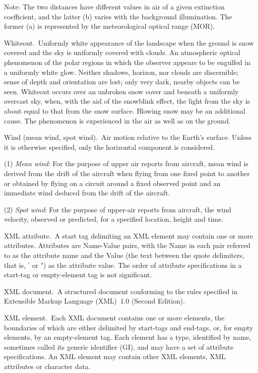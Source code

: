 Note: The two distances have different values in air of a given extinction coefficient, and the latter (b) varies with the background illumination. The former (a) is represented by the meteorological optical range (MOR).

Whiteout. Uniformly white appearance of the landscape when the ground is snow covered and the sky is uniformly covered with clouds. An atmospheric optical phenomenon of the polar regions in which the observer appears to be engulfed in a uniformly white glow. Neither shadows, horizon, nor clouds are discernible; sense of depth and orientation are lost; only very dark, nearby objects can be seen. Whiteout occurs over an unbroken snow cover and beneath a uniformly overcast sky, when, with the aid of the snowblink effect, the light from the sky is about equal to that from the snow surface. Blowing snow may be an additional cause. The phenomenon is experienced in the air as well as on the ground.

Wind (mean wind, spot wind). Air motion relative to the Earth's surface. Unless it is otherwise specified, only the horizontal component is considered.

(1) \emph{Mean wind}: For the purpose of upper air reports from aircraft, mean wind is derived from the drift of the aircraft when flying from one fixed point to another or obtained by flying on a circuit around a fixed observed point and an immediate wind deduced from the drift of the aircraft.

(2) \emph{Spot wind}: For the purpose of upper-air reports from aircraft, the wind velocity, observed or predicted, for a specified location, height and time.

XML attribute. A start tag delimiting an XML element may contain one or more attributes. Attributes are Name-Value pairs, with the Name in each pair referred to as the attribute name and the Value (the text between the quote delimiters, that is, ' or ") as the attribute value. The order of attribute specifications in a start-tag or empty-element tag is not significant.

XML document. A structured document conforming to the rules specified in Extensible Markup Language (XML)~1.0 (Second Edition).

XML element. Each XML document contains one or more elements, the boundaries of which are either delimited by start-tags and end-tags, or, for empty elements, by an empty-element tag. Each element has a type, identified by name, sometimes called its generic identifier (GI), and may have a set of attribute specifications. An XML element may contain other XML elements, XML attributes or character data.

